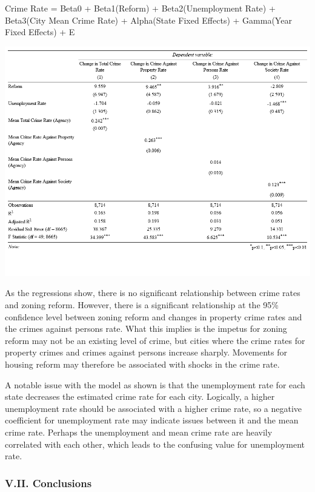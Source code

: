 \documentclass[
  12pt,
]{article}
\begin{document}
Crime Rate = Beta0 + Beta1(Reform) + Beta2(Unemployment Rate) +
Beta3(City Mean Crime Rate) + Alpha(State Fixed Effects) + Gamma(Year
Fixed Effects) + E

\includegraphics{Data/Regression Outputs/pngs/finalchangeregv2.png}

As the regressions show, there is no significant relationship between
crime rates and zoning reform. However, there is a significant
relationship at the 95\% confidence level between zoning reform and
changes in property crime rates and the crimes against persons rate.
What this implies is the impetus for zoning reform may not be an
existing level of crime, but cities where the crime rates for property
crimes and crimes against persons increase sharply. Movements for
housing reform may therefore be associated with shocks in the crime
rate.

A notable issue with the model as shown is that the unemployment rate
for each state decreases the estimated crime rate for each city.
Logically, a higher unemployment rate should be associated with a higher
crime rate, so a negative coefficient for unemployment rate may indicate
issues between it and the mean crime rate. Perhaps the unemployment and
mean crime rate are heavily correlated with each other, which leads to
the confusing value for unemployment rate.

\hypertarget{v.ii.-conclusions}{%
\subsubsection{V.II. Conclusions}\label{v.ii.-conclusions}}
\end{document}
